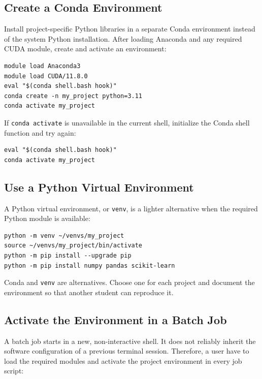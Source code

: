 \documentclass[11pt,oneside]{memoir}
\begin{document}
\FloatBarrier
\subsection{Create a Conda Environment}
\label{subsec:conda-environment}

Install project-specific Python libraries in a separate Conda environment instead of the system Python installation. After loading Anaconda and any required CUDA module, create and activate an environment:

\begin{lstlisting}[style=terminal]
module load Anaconda3
module load CUDA/11.8.0
eval "$(conda shell.bash hook)"
conda create -n my_project python=3.11
conda activate my_project
\end{lstlisting}

If \texttt{conda activate} is unavailable in the current shell, initialize the Conda shell function and try again:

\begin{lstlisting}[style=terminal]
eval "$(conda shell.bash hook)"
conda activate my_project
\end{lstlisting}

\subsection{Use a Python Virtual Environment}
\label{subsec:python-venv}

A Python virtual environment, or \texttt{venv}, is a lighter alternative when the required Python module is available:

\begin{lstlisting}[style=terminal]
python -m venv ~/venvs/my_project
source ~/venvs/my_project/bin/activate
python -m pip install --upgrade pip
python -m pip install numpy pandas scikit-learn
\end{lstlisting}

Conda and \texttt{venv} are alternatives. Choose one for each project and document the environment so that another student can reproduce it.

\subsection{Activate the Environment in a Batch Job}
\label{subsec:batch-environment}

A batch job starts in a new, non-interactive shell. It does not reliably inherit the software configuration of a previous terminal session. Therefore, a user have to load the required modules and activate the project environment in every job script:
\end{document}
